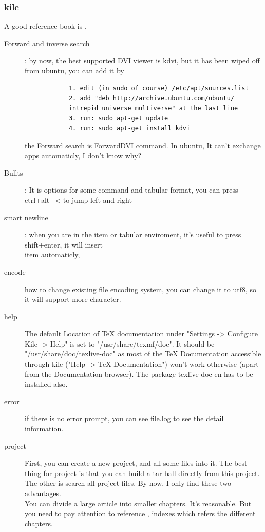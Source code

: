 \documentclass[a4paper,12pt,twoside]{book}
\begin{document}
	\subsubsection{kile}
		A good reference book is \cite{Kile}.\\
		\begin{description}
			\item[Forward and inverse search]:
			by now, the best supported DVI viewer is kdvi, but it has been wiped off from ubuntu, you can add it by
			\begin{verbatim}
			1. edit (in sudo of course) /etc/apt/sources.list
			2. add "deb http://archive.ubuntu.com/ubuntu/
			intrepid universe multiverse" at the last line
			3. run: sudo apt-get update
			4. run: sudo apt-get install kdvi
			\end{verbatim}
			the Forward search is ForwardDVI command. In ubuntu, It can't exchange apps automaticly, I don't know why?
			\item[Bullts]:
			It is options for some command and tabular format, you can press ctrl+alt+< to jump left and right
			\item[smart newline]:
			when you are in the item or tabular enviroment, it's useful to press shift+enter, it will insert \\item automaticly,
			\item[encode] how to change existing file encoding system, you can change it to utf8, so it will support more character.
			\item[help]
			The default Location of TeX documentation under "Settings -> Configure Kile -> Help" is set to "/usr/share/texmf/doc". It should be "/usr/share/doc/texlive-doc" as most of the TeX Documentation accessible through kile ("Help -> TeX Documentation") won't work otherwise (apart from the Documentation browser). The package texlive-doc-en has to be installed also.
			\item[error]
			if there is no error prompt, you can see file.log to see the detail information.
			\item[project]
			First, you  can create a new project, and all some files into it. The best thing for project is that you can build a tar ball directly from this project. The other is search all project files. By now, I only find these two advantages.  \\

You can divide a large article into smaller chapters. It's reasonable. But you need to pay attention to reference , indexes which refers the different chapters.
		\end{description}
	
\end{document}
